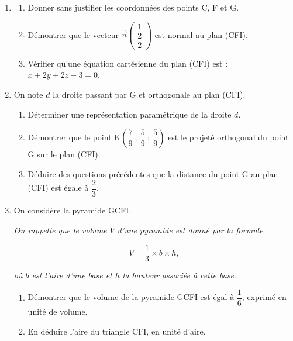 \documentclass[10pt]{article}
\providecommand{\vect}[1]{\overrightarrow{#1}}
\begin{document}
\begin{enumerate}
\item 
	\begin{enumerate}
		\item Donner sans justifier les coordonnées des points C, F et G.
		\item Démontrer que le vecteur $\vect{n}\begin{pmatrix}1\\2\\2\end{pmatrix}$ est normal au plan (CFI).
		\item Vérifier qu'une équation cartésienne du plan (CFI) est : $x + 2y + 2z - 3 = 0$.
	\end{enumerate}	
\item  On note $d$ la droite passant par G et orthogonale au plan (CFI).
	\begin{enumerate}
		\item Déterminer une représentation paramétrique de la droite $d$.
		\item Démontrer que le point K$\left(\dfrac79~;~\dfrac59~;~\dfrac59\right)$ est le projeté orthogonal du point G sur le plan (CFI).
		\item Déduire des questions précédentes que la distance du point G au plan (CFI) est
égale à $\dfrac23$.
	\end{enumerate}
\item On considère la pyramide GCFI.

\emph{On rappelle que le volume $V$ d'une pyramide est donné par la formule} 

\[V = \frac13 \times b \times h,\]

\emph{où $b$ est l'aire d'une base et $h$ la hauteur associée à cette base}.
	\begin{enumerate}
		\item Démontrer que le volume de la pyramide GCFI est égal à $\dfrac16$, exprimé en unité de volume.
		\item En déduire l'aire du triangle CFI, en unité d'aire.
	\end{enumerate}
\end{enumerate}
\end{document}
